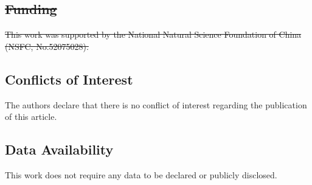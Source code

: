 \documentclass{article}
\providecommand{\DIFdel}[1]{{\protect\color{red}\sout{#1}}}                      %
\providecommand{\DIFdelbegin}{} %
\providecommand{\DIFdelend}{} %
\newcommand{\DIFscaledelfig}{0.5}
\newlength{\DIFdelgraphicswidth} %
\newlength{\DIFdelgraphicsheight} %
\newcommand{\DIFdelincludegraphics}[2][]{%
\sbox{\DIFdelgraphicsbox}{\DIFOincludegraphics[#1]{#2}}%
\settoboxwidth{\DIFdelgraphicswidth}{\DIFdelgraphicsbox} %
\settoboxtotalheight{\DIFdelgraphicsheight}{\DIFdelgraphicsbox} %
\scalebox{\DIFscaledelfig}{%
\parbox[b]{\DIFdelgraphicswidth}{\usebox{\DIFdelgraphicsbox}\\[-\baselineskip] \rule{\DIFdelgraphicswidth}{0em}}\llap{\resizebox{\DIFdelgraphicswidth}{\DIFdelgraphicsheight}{%
\setlength{\unitlength}{\DIFdelgraphicswidth}%
\begin{picture}(1,1)%
\thicklines\linethickness{2pt} %
{\color[rgb]{1,0,0}\put(0,0){\framebox(1,1){}}}%
{\color[rgb]{1,0,0}\put(0,0){\line( 1,1){1}}}%
{\color[rgb]{1,0,0}\put(0,1){\line(1,-1){1}}}%
\end{picture}%
}\hspace*{3pt}}} %
} %
\DeclareRobustCommand{\DIFdelbegin}{\DIFOdelbegin \let\includegraphics\DIFdelincludegraphics} %
\DeclareRobustCommand{\DIFdelend}{\DIFOaddend \let\includegraphics\DIFOincludegraphics} %
\begin{document}
\DIFdelbegin \subsection*{\DIFdel{Funding}}

\DIFdel{This work was supported by the National Natural Science Foundation of China (NSFC, No.52075028).
}\DIFdelend %

\subsection*{Conflicts of Interest}

The authors declare that there is no conflict of interest regarding the publication of this article.

\subsection*{Data Availability}

This work does not require any data to be declared or publicly disclosed.



\end{document}
